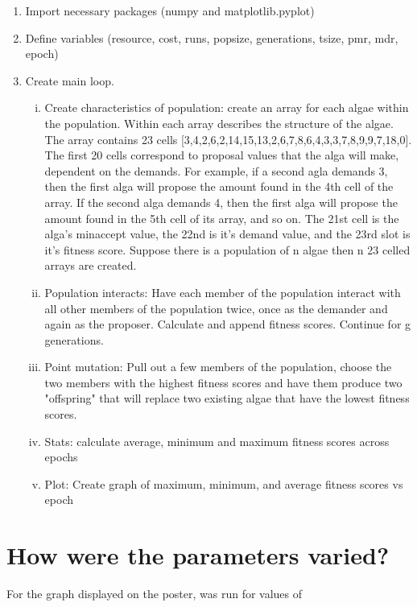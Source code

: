 \documentclass[]{article}
\begin{document}
\begin{enumerate}[\{1\}]
\item Import necessary packages (numpy and matplotlib.pyplot)
\item Define variables (resource, cost, runs, popsize, generations, tsize, pmr, mdr, epoch)
\item Create main loop. 
    \begin{enumerate}[i)]
        \item Create characteristics of population: create an array for each algae within the population. Within each array describes the structure of the algae. The array contains 23 cells [3,4,2,6,2,14,15,13,2,6,7,8,6,4,3,3,7,8,9,9,7,18,0].
The first 20 cells correspond to proposal values that the alga will make, dependent on the demands. For example, if a second agla demands 3, then the first alga will propose the amount found in the 4th cell of the array. If the second alga demands 4, then the first alga will propose the amount found in the 5th cell of its array, and so on. The 21st cell is the alga's minaccept value, the 22nd is it's demand value, and the 23rd slot is it's fitness score. Suppose there is a population of n algae then n 23 celled arrays are created.   
        \item Population interacts: Have each member of the population interact with all other members of the population twice, once as the demander and again as the proposer. Calculate and append fitness scores. Continue for g generations. 
        \item Point mutation: Pull out a few members of the population, choose the two members with the highest fitness scores and have them produce two "offspring" that will replace two existing algae that have the lowest fitness scores.
        \item Stats: calculate average, minimum and maximum fitness scores across epochs
        \item Plot: Create graph of maximum, minimum, and average fitness scores vs epoch
            \end{enumerate}
\end{enumerate}

\section{How were the parameters
varied?}\label{how-were-the-parameters-varied}

For the graph displayed on the poster, was run for values of
\end{document}
